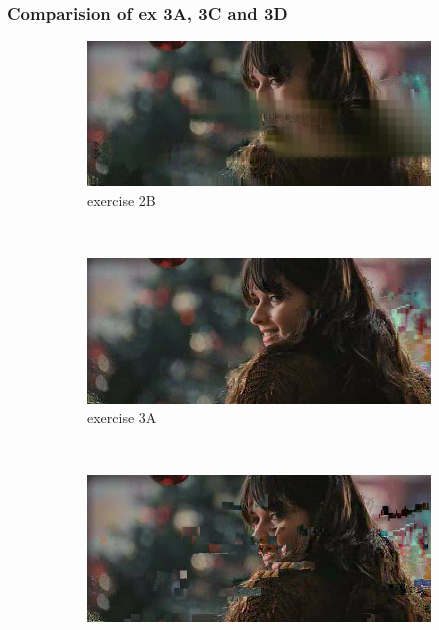 \documentclass[a4paper,11pt,oneside]{article}
\begin{document}
\subsubsection*{Comparision of ex 3A, 3C and 3D}
\begin{figure}[h]
        \begin{subfigure}[h]{0.5\textwidth}
                \includegraphics[width=\textwidth]{img/2B_complex.png}
                \caption{exercise 2B}\label{subfig:2B}
        \end{subfigure}%
        ~
        \begin{subfigure}[h]{0.5\textwidth}
                \includegraphics[width=\textwidth]{img/3A_complex.png}
                \caption{exercise 3A}\label{subfig:3A}
        \end{subfigure}
        ~
        \begin{subfigure}[h]{0.5\textwidth}
                \includegraphics[width=\textwidth]{img/3C_complex.png}

\end{subfigure}
\end{figure}
\end{document}
